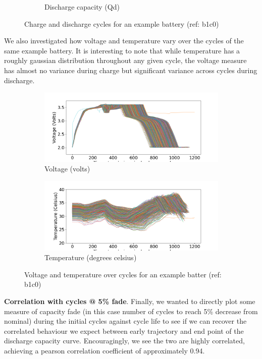 \documentclass{article}
\begin{document}
\begin{figure}[H]
\begin{subfigure}[b]{0.32\linewidth}
            \caption{Discharge capacity (Qd)}
        \end{subfigure}
        \caption{Charge and discharge cycles for an example battery (ref: b1c0)}
        \label{fig:1c}
    \end{figure}

We also investigated how voltage and temperature vary over the cycles of the same example battery. It is interesting to note that while temperature has a roughly gaussian distribution throughout any given cycle, the voltage measure has almost no variance during charge but significant variance across cycles during discharge. 

    \begin{figure}[H]
        \centering
        \begin{subfigure}[b]{0.49\linewidth}
            \includegraphics[width=\linewidth]{figs/b1c0_voltage_intracycle.png}
            \caption{Voltage (volts)}
        \end{subfigure}
        \begin{subfigure}[b]{0.49\linewidth}
            \includegraphics[width=\linewidth]{figs/b1c0_temp_intracycle.png}
            \caption{Temperature (degrees celsius)}
        \end{subfigure}
        \caption{Voltage and temperature over cycles for an example batter (ref: b1c0)}
        \label{fig:1d}
    \end{figure}
    
\textbf{Correlation with cycles @ 5\% fade}. Finally, we wanted to directly plot some measure of capacity fade (in this case number of cycles to reach 5\% decrease from nominal) during the initial cycles against cycle life to see if we can recover the correlated behaviour we expect between early trajectory and end point of the discharge capacity curve. Encouragingly, we see the two are highly correlated, achieving a pearson correlation coefficient of approximately 0.94.
\end{document}
